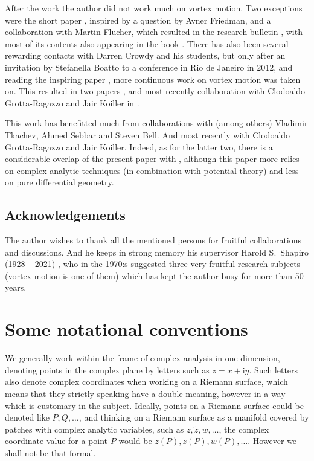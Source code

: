 \documentclass[reqno,12pt]{article}
\theoremstyle{plain}
\theoremstyle{definition}
\numberwithin{equation}{section}
\numberwithin{figure}{section}
\def\I{\mathrm{i}}
\begin{document}
After the work \cite{Gustafsson-1979} the author did not work much on vortex motion. Two exceptions were the short paper
\cite{Gustafsson-1990a}, inspired by a question by Avner Friedman, and a collaboration with Martin Flucher, which
resulted in the research bulletin \cite{Flucher-Gustafsson-1997}, with most of its contents also appearing in the book \cite{Flucher-1999}.  
There has also been several rewarding contacts with Darren Crowdy and his students, but only after an invitation by Stefanella Boatto to a conference
in Rio de Janeiro in 2012, and reading the inspiring paper \cite{Boatto-Koiller-2013}, more continuous
work on vortex motion was taken on. This resulted in two papers  \cite{Gustafsson-2019, Gustafsson-2022a},
and most recently collaboration with Clodoaldo Grotta-Ragazzo and Jair Koiller in \cite{Grotta-Ragazzo-Gustafsson-Koiller-2024}.

This work has benefitted much from collaborations with (among others)
Vladimir Tkachev, Ahmed Sebbar and Steven Bell. And most recently with Clodoaldo Grotta-Ragazzo and Jair Koiller. Indeed, as for the
latter two, there is a considerable overlap of the present paper with \cite{Grotta-Ragazzo-Gustafsson-Koiller-2024}, although this paper
more relies on complex analytic techniques (in combination with potential theory) and less on pure differential geometry. 

\subsection{Acknowledgements}

The author wishes to thank all the mentioned persons for fruitful collaborations and discussions. And he keeps in strong memory his
supervisor Harold S.~Shapiro (1928 -- 2021) \cite{Gustafsson-2022}, who in the 1970:s suggested three very fruitful research subjects (vortex motion is
one of them) which has kept the author busy for more than 50 years.
  

\section{Some notational conventions}\label{sec:notations}

We generally work within the frame of complex analysis in one dimension, denoting points in the complex plane
by letters such as $z=x+\I y$. Such letters also denote complex coordinates when working on a Riemann surface,
which means that they strictly speaking have a double meaning, however in a way which is customary in the subject.
Ideally, points on a Riemann surface could be denoted like $P, Q,\dots$, and thinking on a Riemann surface as a manifold
covered by patches with complex analytic variables, such as $z, \tilde{z}, w, \dots$, 
the complex coordinate value for a point $P$ would be $z(P), \tilde{z}(P), w(P), \dots$. However we shall not be that formal.
\end{document}

